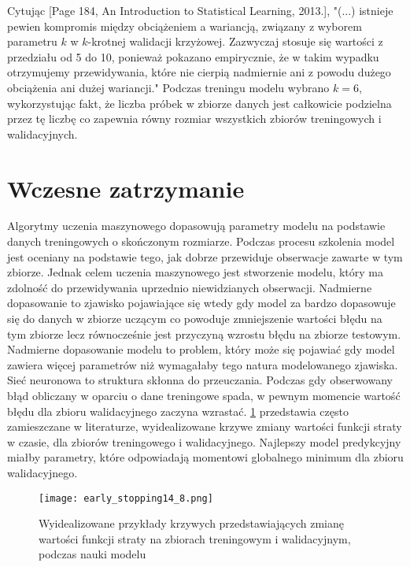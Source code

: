 \documentclass[]{article}
\theoremstyle{definition}
\begin{document}
Cytując [Page 184, An Introduction to Statistical Learning, 2013.], "(...) istnieje pewien kompromis między obciążeniem a wariancją, związany z wyborem parametru $k$ w $k$-krotnej walidacji krzyżowej. Zazwyczaj stosuje się wartości z przedziału od 5 do 10, ponieważ pokazano empirycznie, że w takim wypadku otrzymujemy przewidywania, które nie cierpią nadmiernie ani z powodu dużego obciążenia ani dużej wariancji." Podczas treningu modelu wybrano $k = 6$, wykorzystując fakt, że liczba próbek w zbiorze danych jest całkowicie podzielna przez tę liczbę co zapewnia równy rozmiar wszystkich zbiorów treningowych i walidacyjnych.

\section{Wczesne zatrzymanie}
Algorytmy uczenia maszynowego dopasowują parametry modelu na podstawie danych treningowych o skończonym rozmiarze. Podczas procesu szkolenia model jest oceniany na podstawie tego, jak dobrze przewiduje obserwacje zawarte w tym zbiorze. Jednak celem uczenia maszynowego jest stworzenie modelu, który ma zdolność do przewidywania uprzednio niewidzianych obserwacji. Nadmierne dopasowanie to zjawisko pojawiające się wtedy gdy model za bardzo dopasowuje się do danych w zbiorze uczącym co powoduje zmniejszenie wartości błędu na tym zbiorze lecz równocześnie jest przyczyną wzrostu błędu na zbiorze testowym. Nadmierne dopasowanie modelu to problem, który może się pojawiać gdy model zawiera więcej parametrów niż wymagałaby tego natura modelowanego zjawiska. Sieć neuronowa to struktura skłonna do przeuczania. Podczas gdy obserwowany błąd obliczany w oparciu o dane treningowe spada, w pewnym momencie wartość błędu dla zbioru walidacyjnego zaczyna wzrastać. \figurename{} \ref{fig:loss_curves} przedstawia często zamieszczane w literaturze, wyidealizowane krzywe zmiany wartości funkcji straty w czasie, dla zbiorów treningowego i walidacyjnego. Najlepszy model predykcyjny miałby parametry, które odpowiadają momentowi globalnego minimum dla zbioru walidacyjnego.




\begin{figure}[htp!]
	\centering
	\texttt{[image: early\_stopping14\_8.png]}
	\caption{Wyidealizowane przykłady krzywych przedstawiających zmianę wartości funkcji straty na zbiorach treningowym i walidacyjnym, podczas nauki modelu}
	\label{fig:loss_curves}
\end{figure}
\end{document}
